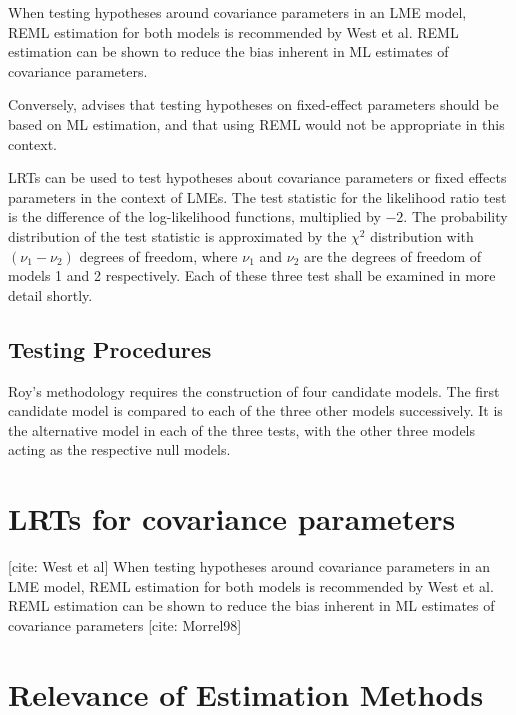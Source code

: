 \documentclass[12pt, a4paper]{report}
\theoremstyle{plain}
\theoremstyle{definition}
\theoremstyle{remark}
\begin{document}
When testing hypotheses around covariance parameters in an LME model, REML estimation for both models is recommended by West et al. REML estimation can be shown to reduce the bias inherent in ML estimates of covariance parameters.

Conversely, \citet{ARoy2009} advises that testing hypotheses on fixed-effect parameters should be based on ML estimation, and that using REML would not be appropriate in this
context.

LRTs can be used to test hypotheses about covariance parameters or fixed effects
parameters in the context of LMEs. The test statistic for the likelihood ratio test
is the difference of the log-likelihood functions, multiplied by $-2$. The probability
distribution of the test statistic is approximated by the $\chi^2$ distribution with $(\nu_1 - \nu_2)$
degrees of freedom, where $\nu_1$ and $\nu_2$ are the degrees of freedom of models 1 and 2
respectively. Each of these three test shall be examined in more detail shortly.

\subsection{Testing Procedures}
Roy's methodology requires the construction of four candidate models. The first candidate model is compared to each of the three other models successively. It is the
alternative model in each of the three tests, with the other three models acting as the
respective null models.



\section{LRTs for covariance parameters}
[cite: West et al] When testing hypotheses around covariance parameters in an LME model, REML estimation for both models is recommended by West et al. REML estimation can be shown to reduce the bias inherent in ML estimates of covariance parameters [cite: Morrel98]

\section{Relevance of Estimation Methods}
\end{document}
